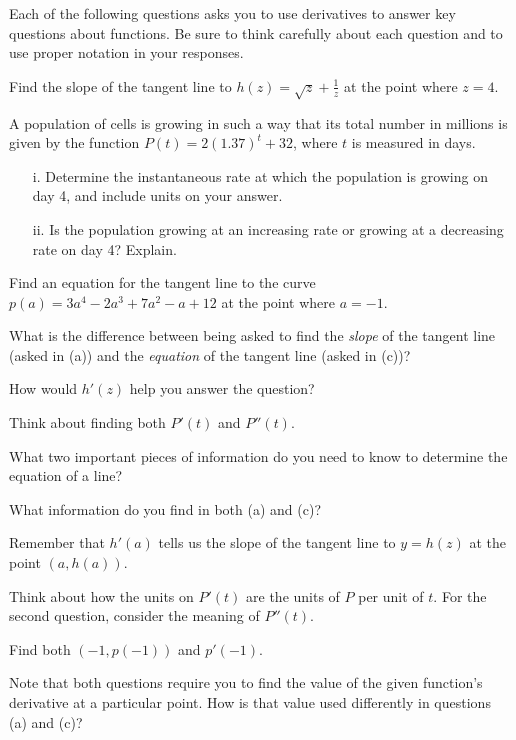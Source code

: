 \begin{activity} \label{A:2.1.3}  
Each of the following questions asks you to use derivatives to answer key questions about functions.  Be sure to think carefully about each question and to use proper notation in your responses.
\ba
	\item Find the slope of the tangent line to $h(z) = \sqrt{z} + \frac{1}{z}$ at the point where $z = 4$.
	\item A population of cells is growing in such a way that its total number in millions is given by the function $P(t) = 2(1.37)^t + 32$, where $t$ is measured in days.  
	\begin{enumerate}
	  \item[i.] Determine the instantaneous rate at which the population is growing on day 4, and include units on your answer.  
	  \item[ii.] Is the population growing at an increasing rate or growing at a decreasing rate on day 4?  Explain.
	\end{enumerate}
	\item Find an equation for the tangent line to the curve $p(a) = 3a^4 - 2a^3 + 7a^2 - a + 12$ at the point where $a=-1$.
	\item What is the difference between being asked to find the \emph{slope} of the tangent line (asked in (a)) and the \emph{equation} of the tangent line (asked in (c))?
\ea
\end{activity}
\begin{smallhint}
\ba
	  \item How would $h'(z)$ help you answer the question?
	  \item Think about finding both $P'(t)$ and $P''(t)$.
	  \item What two important pieces of information do you need to know to determine the equation of a line?
	  \item What information do you find in both (a) and (c)?
\ea
\end{smallhint}
\begin{bighint}
\ba
	  \item Remember that $h'(a)$ tells us the slope of the tangent line to $y = h(z)$ at the point $(a,h(a))$.
	  \item Think about how the units on $P'(t)$ are the units of $P$ per unit of $t$.  For the second question, consider the meaning of $P''(t)$.
	  \item Find both $(-1,p(-1))$ and $p'(-1)$.
	  \item Note that both questions require you to find the value of the given function's derivative at a particular point.  How is that value used differently in questions (a) and (c)?
\ea
\end{bighint}
